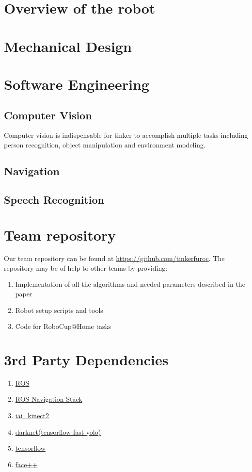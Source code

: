 \documentclass[runningheads,a4paper]{llncs}
\begin{document}
\section{Overview of the robot}


\section{Mechanical Design}


\section{Software Engineering}
\subsection{Computer Vision}
Computer vision is indispensable for tinker to accomplish multiple tasks including person recognition, object manipulation and environment modeling.


\subsection{Navigation}


\subsection{Speech Recognition}




\newpage

\section{Team repository}
Our team repository can be found at \url{https://github.com/tinkerfuroc}. The repository may be of help to other teams by providing:
\begin{enumerate}
    \item Implementation of all the algorithms and needed parameters described in the paper
    \item Robot setup scripts and tools
    \item Code for RoboCup@Home tasks 
\end{enumerate}

\section{3rd Party Dependencies}
\begin{enumerate}
    \item \href{www.ros.org}{ROS}
    \item \href{github.com/ros-planning/navigation}{ROS Navigation Stack}
    \item \href{github.com/code-iai/iai\_kinect2}{iai\_kinect2}
    \item \href{github.com/pjreddie/darknet}{darknet(tensorflow fast yolo)}
    \item \href{www.tensorflow.org}{tensorflow}
    \item \href{www.faceplusplus.com}{face++}
\end{enumerate}
\end{document}
